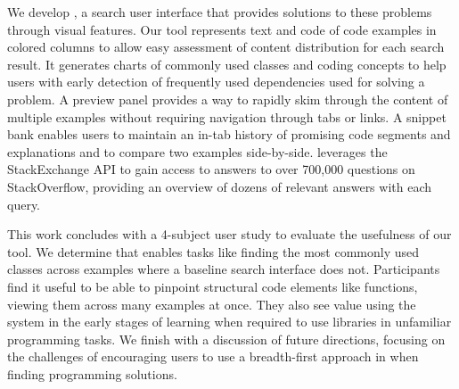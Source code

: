 We develop \systemname{}, a search user interface that provides solutions to these problems through visual features.
Our tool represents text and code of code examples in colored columns to allow easy assessment of content distribution for each search result.
It generates charts of commonly used classes and coding concepts to help users with early detection of frequently used dependencies used for solving a problem.
A preview panel provides a way to rapidly skim through the content of multiple examples without requiring navigation through tabs or links.
A snippet bank enables users to maintain an in-tab history of promising code segments and explanations and to compare two examples side-by-side.
\systemname{} leverages the StackExchange API to gain access to answers to over 700,000 questions on StackOverflow, providing an overview of dozens of relevant answers with each query.

This work concludes with a 4-subject user study to evaluate the usefulness of our tool.
We determine that \systemname{} enables tasks like finding the most commonly used classes across examples where a baseline search interface does not.
Participants find it useful to be able to pinpoint structural code elements like functions, viewing them across many examples at once.
They also see value using the system in the early stages of learning when required to use libraries in unfamiliar programming tasks.
We finish with a discussion of future directions, focusing on the challenges of encouraging users to use a breadth-first approach in when finding programming solutions.
